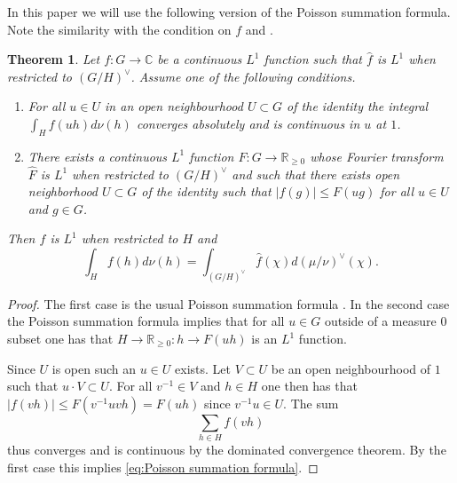 \documentclass[a4paper,11pt,reqno]{amsart}
\newcommand{\R}{\mathbb{R}}
\newcommand{\C}{\mathbb{C}}
\newtheorem{theorem}{Theorem}[section]
\theoremstyle{definition}
\begin{document}
In this paper we will use the following version of the Poisson summation formula. Note the similarity with the condition on $f$ and \cite[Cor.~3.36]{Bourqui2011Fonction}.
\begin{theorem}\label{thm:Poisson summation}
	Let $f: G \to \C$ be a continuous $L^1$ function such that $\hat{f}$ is $L^1$ when restricted to $(G/H)^{\vee}$. Assume one of the following conditions.
	\begin{enumerate}
		\item For all $u \in U$ in an open neighbourhood $U \subset G$ of the identity the integral $\int_{H} f(u h) d \nu(h)$ converges absolutely and is continuous in $u$ at $1$.
		\item There exists a continuous $L^1$ function $F: G \to \R_{\geq 0}$ whose Fourier transform $\hat{F}$ is $L^1$ when restricted to $(G/H)^{\vee}$ and such that there exists open neighborhood $U \subset G$ of the identity such that $|f(g)| \leq F(u g)$ for all $u \in U$ and $g \in G$.
	\end{enumerate}
	
	Then $f$ is $L^1$ when restricted to $H$ and 
	\begin{equation}\label{eq:Poisson summation formula}
		\int_{H} f(h) d\nu(h) = \int_{(G/H)^{\vee}} \hat{f}(\chi) d(\mu/\nu)^{\vee}(\chi).
	\end{equation}
\end{theorem}
\begin{proof}
	The first case is the usual Poisson summation formula \cite[Thm.~3.35]{Bourqui2011Fonction}. In the second case the Poisson summation formula implies that for all $u \in G$ outside of a measure $0$ subset one has that $H \to \R_{\geq 0}: h \to F(uh)$ is an $L^1$ function.
	
	Since $U$ is open such an $u \in U$ exists. Let $V \subset U$ be an open neighbourhood of $1$ such that $u \cdot V \subset U$. For all $v^{-1} \in V$ and $h \in H$ one then has that $|f(v h)| \leq F(v^{-1} u v h) = F(u h)$ since $v^{-1} u \in U$. The sum 
	\[
	\sum_{h \in H} f(v h)
	\]
	thus converges and is continuous by the dominated convergence theorem. By the first case this implies \eqref{eq:Poisson summation formula}.
\end{proof}
\end{document}
